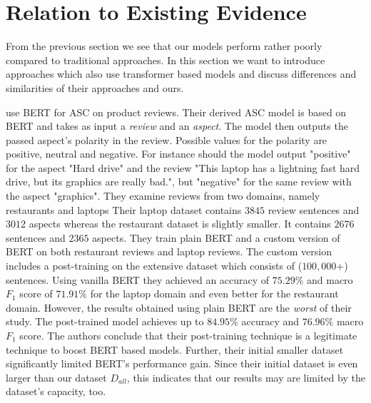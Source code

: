 \chapter{Relation to Existing Evidence}
\label{chp:relation_to_existing_evidence}
From the previous section we see that our models perform rather poorly compared to traditional approaches.
In this section we want to introduce approaches which also use transformer based models and discuss differences and similarities of their approaches and ours.

\Textcite{Xu:2019} use \ac{BERT} for \ac{ASC} on product reviews.
Their derived \ac{ASC} model is based on \ac{BERT} and takes as input a \textit{review} and an \textit{aspect}.
The model then outputs the passed aspect's polarity in the review.
Possible values for the polarity are positive, neutral and negative.
For instance should the model output "positive" for the aspect "Hard drive" and the review "This laptop has a lightning fast hard drive, but its graphics are really bad.", but "negative" for the same review with the aspect "graphics".
They examine reviews from two domains, namely restaurants and laptops
Their laptop dataset contains $3845$ review sentences and $3012$ aspects whereas the restaurant dataset is slightly smaller.
It contains $2676$ sentences and $2365$ aspects.
They train plain \ac{BERT} and a custom version of \ac{BERT} on both restaurant reviews and laptop reviews.
The custom version includes a post-training on the extensive dataset which consists of ($100,000$+) sentences.
Using vanilla \ac{BERT} they achieved an accuracy of $75.29\%$ and macro $F_1$ score of $71.91\%$ for the laptop domain and even better for the restaurant domain.
However, the results obtained using plain \ac{BERT} are the \textit{worst} of their study.
The post-trained model achieves up to $84.95\%$ accuracy and $76.96\%$ macro $F_1$ score.
The authors conclude that their post-training technique is a legitimate technique to boost \ac{BERT} based models.
Further, their initial smaller dataset significantly limited \ac{BERT}'s performance gain.
Since their initial dataset is even larger than our dataset $D_{all}$, this indicates that our results may are limited by the dataset's capacity, too.

